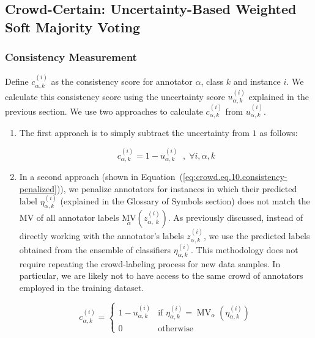 \subsection{Crowd-Certain: Uncertainty-Based Weighted Soft Majority Voting}

\subsubsection{Consistency Measurement}

Define $c_{\alpha,k}^{(i)} $ as the consistency score for annotator $\alpha $, class $k $ and instance $i $. We calculate this consistency score using the uncertainty score $u_{\alpha,k}^{(i)} $ explained in the previous section. We use two approaches to calculate $c_{\alpha,k}^{(i)} $ from $u_{\alpha,k}^{(i)} $.

\begin{enumerate}
    \item The first approach is to simply subtract the uncertainty from $1 $ as follows:

    \begin{equation}
        c_{\alpha,k}^{(i)}=1-u_{\alpha,k}^{(i)}\;\;,\;\forall i,\alpha,k
        \label{eq:crowd.eq.9.consistency}
    \end{equation}

    \item In a second approach (shown in Equation~(\ref{eq:crowd.eq.10.consistency-penalized})), we penalize annotators for instances in which their predicted label $\eta_{\alpha,k}^{(i)} $ (explained in the Glossary of Symbols section) does not match the MV of all annotator labels ${{\underset \alpha{\mathrm{MV}}}{\left(z_{\alpha,\;k}^{(i)}\right)}} $. As previously discussed, instead of directly working with the annotator's labels $z_{\alpha,k}^{(i)} $, we use the predicted labels obtained from the ensemble of classifiers $\eta_{\alpha,k}^{(i)} $. This methodology does not require repeating the crowd-labeling process for new data samples. In particular, we are likely not to have access to the same crowd of annotators employed in the training dataset.

    \begin{equation}
        c_{\alpha,k}^{(i)} =
        \begin{cases}
            1 - u_{\alpha,k}^{(i)} & \text{if } \eta_{\alpha,k}^{(i)} = \operatorname{MV}_{\alpha}(\eta_{\alpha,k}^{(i)}) \\
            0 & \text{otherwise}
        \end{cases}
        \label{eq:crowd.eq.10.consistency-penalized}
    \end{equation}

\end{enumerate}

